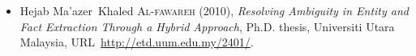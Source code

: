 \documentclass[12pt,a4paper,oneside,notitlepage]{article}
\newcommand{\urlprefix}{URL~}
\begin{document}
\begin{itemize}
\begin{itemize}
\item
Hejab Ma'azer~Khaled \textsc{Al-fawareh} (2010), \emph{Resolving Ambiguity in
  Entity and Fact Extraction Through a Hybrid Approach}, Ph.D. thesis,
  Universiti Utara Malaysia, \urlprefix\url{http://etd.uum.edu.my/2401/}.
\end{itemize}


\end{itemize}
\end{document}
